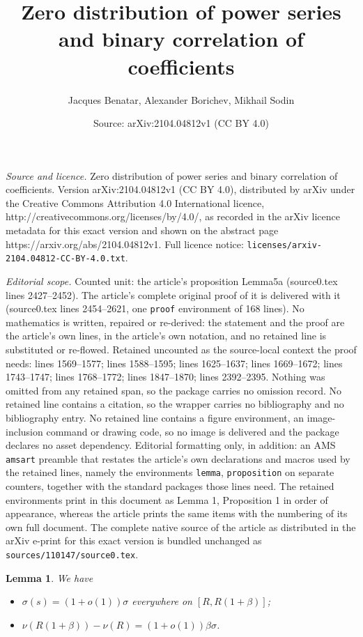 \documentclass[10pt,a4paper]{amsart}
\title{Zero distribution of power series and binary correlation of coefficients}
\author{Jacques Benatar, Alexander Borichev, Mikhail Sodin}
\date{Source: arXiv:2104.04812v1 (CC BY 4.0)}
\newtheorem{lemma}{Lemma}
\begin{document}
\maketitle

\noindent\emph{Source and licence.} Zero distribution of power series and binary correlation of coefficients. Version arXiv:2104.04812v1 (CC BY 4.0), distributed by arXiv under the Creative Commons Attribution 4.0 International licence, http://creativecommons.org/licenses/by/4.0/, as recorded in the arXiv licence metadata for this exact version and shown on the abstract page https://arxiv.org/abs/2104.04812v1. Full licence notice: \texttt{licenses/arxiv-2104.04812-CC-BY-4.0.txt}.\par\smallskip

\noindent\textit{Editorial scope.} Counted unit: the article's proposition Lemma5a (source0.tex lines 2427--2452). The article's complete original proof of it is delivered with it (source0.tex lines 2454--2621, one \texttt{proof} environment of 168 lines). No mathematics is written, repaired or re-derived: the statement and the proof are the article's own lines, in the article's own notation, and no retained line is substituted or re-flowed.  Retained uncounted as the source-local context the proof needs: lines 1569--1577; lines 1588--1595; lines 1625--1637; lines 1669--1672; lines 1743--1747; lines 1768--1772; lines 1847--1870; lines 2392--2395.  Nothing was omitted from any retained span, so the package carries no omission record.  No retained line contains a citation, so the wrapper carries no bibliography and no bibliography entry.  No retained line contains a figure environment, an image-inclusion command or drawing code, so no image is delivered and the package declares no asset dependency.  Editorial formatting only, in addition: an AMS \texttt{amsart} preamble that restates the article's own declarations and macros used by the retained lines, namely the environments \texttt{lemma}, \texttt{proposition} on separate counters, together with the standard packages those lines need.  The retained environments print in this document as Lemma 1, Proposition 1 in order of appearance, whereas the article prints the same items with the numbering of its own full document.  The complete native source of the article as distributed in the arXiv e-print for this exact version is bundled unchanged as \texttt{sources/110147/source0.tex}.
\begin{lemma}\label{Lemma5A}
We have
\begin{itemize}
\item[{\rm (i)}]
$\sigma (s) = (1+o(1))\sigma $ everywhere on $[R, R(1+\beta)]$;
\item[{\rm (ii)}]
$\nu(R(1+\beta))-\nu (R) = (1+o(1))\beta\sigma$.
\end{itemize}
\end{lemma}
\end{document}
